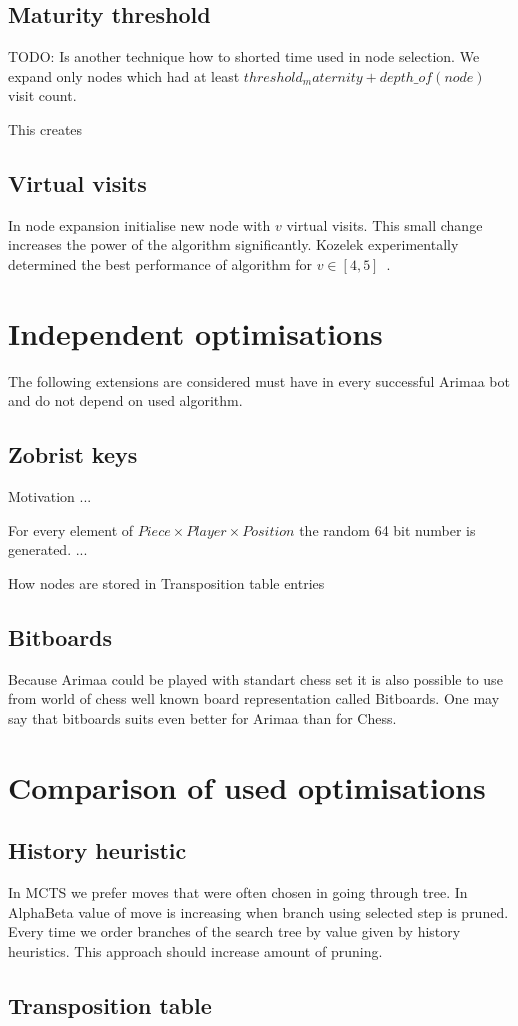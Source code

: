 \subsection{Maturity threshold}
TODO: Is another technique how to shorted time used in node selection. We
expand only nodes which had at least $threshold_maternity + depth\_of(node)$
visit count.

This creates 

\subsection{Virtual visits}
In node expansion initialise new node with $v$ virtual visits. This small
change increases the power of the algorithm significantly. Kozelek
experimentally determined the best performance of algorithm for $v \in
[4,5]$~\cite{KOZELEK}.

\section{Independent optimisations}
The following extensions are considered must have in every successful Arimaa
bot and do not depend on used algorithm.

	\subsection{Zobrist keys}
	Motivation ...

	For every element of $Piece\times Player\times Position$ the random 64 bit
	number is generated. ...

	How nodes are stored in Transposition table entries

	\subsection{Bitboards}
	Because Arimaa could be played with standart chess set it is also possible
	to use from world of chess well known board representation called
	Bitboards. One may say that bitboards suits even better for Arimaa than for
	Chess.

\section{Comparison of used optimisations}

\subsection{History heuristic}
In MCTS we prefer moves that were often chosen in going through tree. In
AlphaBeta value of move is increasing when branch using selected step is
pruned. Every time we order branches of the search tree by value given by
history heuristics. This approach should increase amount of pruning.

\subsection{Transposition table}

